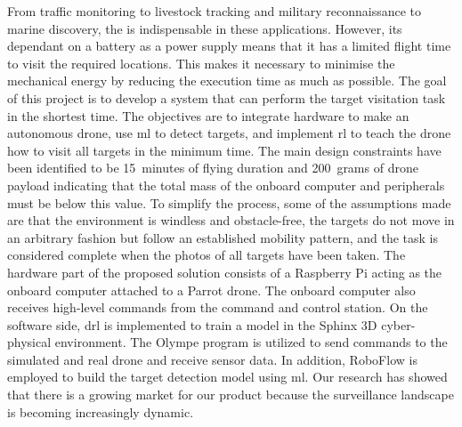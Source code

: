 \documentclass[../main.tex]{subfiles}
\begin{document}
From traffic monitoring to livestock tracking and 
military reconnaissance to marine discovery, the \uav
is indispensable in these applications.
However, its dependant on a battery as a power supply means
that it has a limited flight time to visit the required
locations. This makes it necessary to minimise 
the mechanical energy by reducing the execution time as much
as possible.
The goal of this project is to develop a system 
that can perform the target visitation task in the shortest
time. The objectives are to integrate hardware to make
an autonomous drone, use \gls{ml} 
to detect targets,
and implement \gls{rl} to 
teach the drone how to visit all targets in the minimum time.
The main design constraints have been identified to be 
\SI{15}{minutes} of flying duration and \SI{200}{grams}
of drone payload indicating that the total mass of the 
onboard computer and peripherals must be below this
value. To simplify the process, some of the assumptions
made are that the environment is windless and obstacle-free,
the targets do not move in an arbitrary fashion but follow
an established mobility pattern, and the task is considered
complete when the photos of all targets have been taken.
The hardware part of the proposed solution 
consists of a Raspberry Pi acting as the onboard computer
attached to a Parrot \anafi drone. The onboard computer
also receives high-level commands from the command and control
station. On the software side, \gls{drl} is 
implemented to train a model in the Sphinx 3D
cyber-physical environment. The Olympe program is utilized
to send commands to the simulated and real \anafi drone
and receive sensor data. In addition, RoboFlow is employed
to build the target detection model using \gls{ml}.
Our research has showed that there is a growing market for
our product because the surveillance landscape
is becoming increasingly dynamic.
\end{document}
